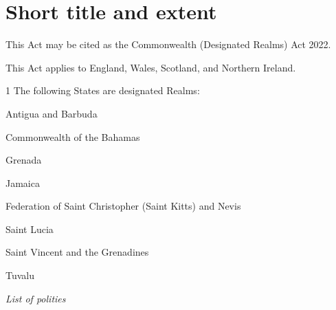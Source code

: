 \documentclass[private]{ukbill}
\begin{document}
\section{Short title and extent}
\begin{numstat}
	\item This Act may be cited as the Commonwealth (Designated Realms) Act 2022.
	\item This Act applies to England, Wales, Scotland, and Northern Ireland.
\end{numstat}

%
%
%

\startschedule


\begin{nostat}
\item[1]   The following States are designated Realms:
\begin{numstat}
	\item Antigua and Barbuda
	\item Commonwealth of the Bahamas
	\item Grenada
	\item Jamaica
	\item Federation of Saint Christopher (Saint Kitts) and Nevis
	\item Saint Lucia
	\item Saint Vincent and the Grenadines
	\item Tuvalu
\end{numstat}

\end{nostat}



\noindent\emph{List of polities}
\end{document}
